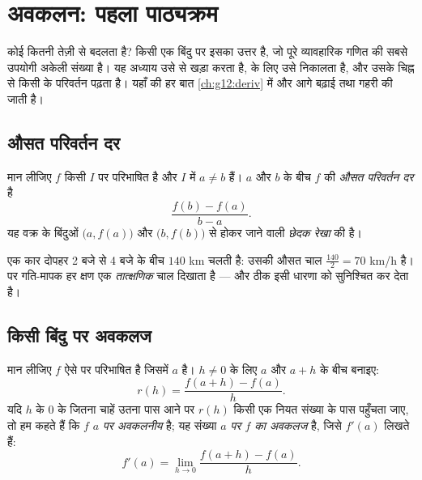 \chapter{अवकलन: पहला पाठ्यक्रम}\label{ch:g11:deriv}

कोई  कितनी तेज़ी से बदलता है? किसी एक बिंदु पर इसका उत्तर \emph{} है,
जो पूरे व्यावहारिक गणित की सबसे उपयोगी अकेली संख्या है। यह अध्याय उसे  से खड़ा करता है,  के लिए उसे निकालता है, और उसके
चिह्न से किसी  के परिवर्तन पढ़ता है। यहाँ की हर बात \cref{ch:g12:deriv} में और आगे बढ़ाई
तथा गहरी की जाती है।

\section{औसत परिवर्तन दर}

\begin{definition}[औसत परिवर्तन दर]\label{def:g11:deriv:rate}
मान लीजिए $f$ किसी  $I$ पर परिभाषित है और $I$ में $a \neq b$ हैं। $a$ और
$b$ के बीच $f$ की \emph{औसत परिवर्तन दर} है
\[
\frac{f(b) - f(a)}{b - a}.
\]
यह वक्र के बिंदुओं $\bigl(a, f(a)\bigr)$ और $\bigl(b, f(b)\bigr)$ से होकर जाने वाली \emph{छेदक
रेखा} की  है।
\end{definition}

\begin{example}
एक कार दोपहर 2 बजे से 4 बजे के बीच $140$ km चलती है: उसकी औसत चाल $\frac{140}{2} = 70$ km/h
है। पर गति-मापक हर क्षण एक \emph{तात्क्षणिक} चाल दिखाता है --- और  ठीक
इसी धारणा को सुनिश्चित कर देता है।
\end{example}

\section{किसी बिंदु पर अवकलज}

\begin{definition}[किसी बिंदु पर अवकलज]\label{def:g11:deriv:derivative}
मान लीजिए $f$ ऐसे  पर परिभाषित है जिसमें $a$ है। $h \neq 0$ के लिए $a$
और $a + h$ के बीच  बनाइए:
\[
r(h) = \frac{f(a+h) - f(a)}{h}.
\]
यदि $h$ के $0$ के जितना चाहें उतना पास आने पर $r(h)$ किसी एक नियत संख्या के
पास पहुँचता जाए, तो हम कहते हैं कि $f$
\emph{$a$ पर अवकलनीय} है; यह संख्या \emph{$a$
पर $f$ का अवकलज} है, जिसे $f'(a)$ लिखते हैं:
\[
f'(a) = \lim_{h \to 0} \frac{f(a+h) - f(a)}{h}.
\]
\end{definition}

